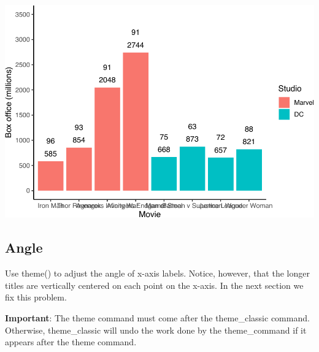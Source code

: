 \documentclass[
]{krantz}
\begin{document}
\includegraphics[width=0.65\linewidth]{bookdown_files/figure-latex/unnamed-chunk-213-1}

\hypertarget{angle}{%
\subsection{Angle}\label{angle}}

Use theme() to adjust the angle of x-axis labels. Notice, however, that the longer titles are vertically centered on each point on the x-axis. In the next section we fix this problem.

\textbf{Important}: The theme command must come after the theme\_classic command. Otherwise, theme\_classic will undo the work done by the theme\_command if it appears after the theme command.
\end{document}
